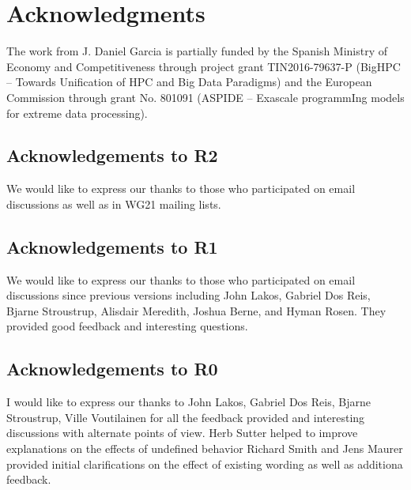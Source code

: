 \section*{Acknowledgments}

The work from J. Daniel Garcia is partially funded by
the Spanish Ministry of Economy and Competitiveness through project grant
TIN2016-79637-P (BigHPC -- Towards Unification of HPC and Big Data Paradigms)
and the European Commission through grant
No. 801091 (ASPIDE -- Exascale programmIng models for extreme data processing).

\subsection*{Acknowledgements to R2}

We would like to express our thanks to those who participated on email discussions
as well as in WG21 mailing lists.

\subsection*{Acknowledgements to R1}

We would like to express our thanks to those who participated on email discussions
since previous versions including John Lakos, Gabriel Dos Reis, Bjarne Stroustrup,
Alisdair Meredith, Joshua Berne, and Hyman Rosen. They provided good feedback and
interesting questions.

\subsection*{Acknowledgements to R0}

I would like to express our thanks to John Lakos, Gabriel Dos Reis, Bjarne
Stroustrup, Ville Voutilainen for all the feedback provided and interesting
discussions with alternate points of view.
Herb Sutter helped to improve explanations on the effects of undefined behavior
Richard Smith and Jens Maurer provided initial clarifications on the effect of
existing wording as well as additiona feedback.

